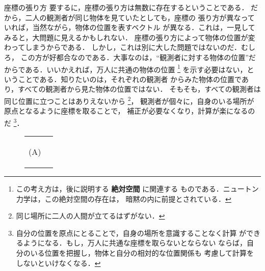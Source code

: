 \begin{memo}{座標の張り方}
                要するに，座標の張り方は無数に存在するということである．
                だから，二人の観測者が同じ物体を見ていたとしても，座標の
                張り方が異なっていれば，当然ながら，物体の位置を表すベクトル
                が異なる．これは，一見してみると，大問題に見えるかもしれない．
                座標の張り方によって物体の位置が変わってしまうからである．
                しかし，これは別に大した問題ではないのだ．むしろ，
                この方が好都合なのである．大事なのは，“観測者に対する物体の位置”だ
                からである．いいかえれば，万人に共通の物体の位置
                    \footnote{
                        この考え方は，後に説明する \textbf{絶対空間} に関連する
                        ものである．ニュートン力学は，この絶対空間の存在は，
                        暗黙の内に前提とされている．
                    }
                を示す必要はない，ということである．知りたいのは，それぞれの観測者
                からみた物体の位置であり，すべての観測者から見た物体の位置ではない．
                そもそも，すべての観測者は同じ位置に立つことはありえないから
                    \footnote{
                        同じ場所に二人の人間が立てるはずがない．
                    }，
                観測者が個々に，自身のいる場所が原点となるように座標を取ることで，
                補正が必要なくなり，計算が楽になるのだ
                    \footnote{
                        自分の位置を原点にとることで，自身の場所を意識することなく計算
                        ができるようになる．もし，万人に共通な座標を取らないとならない
                        ならば，自分のいる位置を把握し，物体と自分の相対的な位置関係も
                        考慮して計算をしないといけなくなる．
                    }．
                \begin{figure}[hbt]
                                        \centering
                    \begin{tabular}{cc}
                        \begin{minipage}{0.45\hsize}
                            \begin{center}
                                {ZahyouChokkouChokusen001.pdf}

                                (A)
                            \end{center}
                        \end{minipage}
                        \begin{minipage}{0.45\hsize}
                            \begin{center}
                                {ZahyouChokkouChokusen002.pdf}


\end{center}
\end{minipage}
\end{tabular}
\end{figure}
\end{memo}
